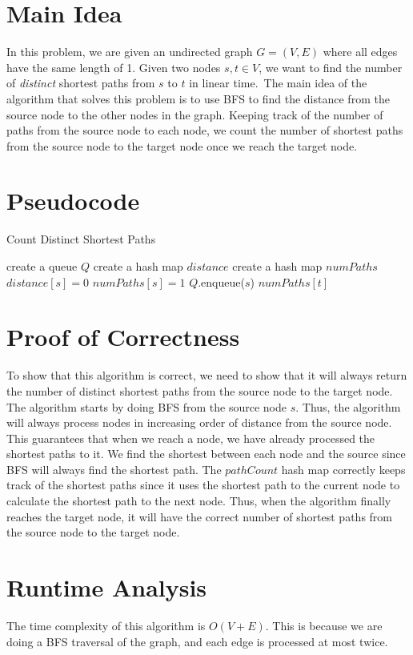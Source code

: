 \documentclass{article}
\begin{document}
\section{Main Idea}

In this problem, we are given an undirected graph $G = (V, E)$ where all edges have the same length of 1.
Given two nodes $s, t \in V$, we want to find the number of \textit{distinct} shortest paths from $s$ to $t$ in linear time.\
The main idea of the algorithm that solves this problem is to use BFS to find the distance from the source node to the other nodes in the graph.
Keeping track of the number of paths from the source node to each node, we count the number of shortest paths from the source node to the target node once we reach the target node.

\section{Pseudocode}

\begin{algorithm}[H]
\caption{Count Distinct Shortest Paths}
\KwOut{The number of distinct shortest paths from $s$ to $t$}
\BlankLine
create a queue $Q$\;
create a hash map $distance$\;
create a hash map $numPaths$\;
\BlankLine
{}
$distance[s] = 0$\;
$numPaths[s] = 1$\;
$Q$.enqueue($s$)\;
\BlankLine
{}
\Return $numPaths[t]$\;
\end{algorithm}

\section{Proof of Correctness}

To show that this algorithm is correct, we need to show that it will always return the number of distinct shortest paths from the source node to the target node.
The algorithm starts by doing BFS from the source node $s$.
Thus, the algorithm will always process nodes in increasing order of distance from the source node.
This guarantees that when we reach a node, we have already processed the shortest paths to it.
We find the shortest between each node and the source since BFS will always find the shortest path.
The $pathCount$ hash map correctly keeps track of the shortest paths since it uses the shortest path to the current node to calculate the shortest path to the next node.
Thus, when the algorithm finally reaches the target node, it will have the correct number of shortest paths from the source node to the target node.

\section{Runtime Analysis}

The time complexity of this algorithm is $O(V + E)$.
This is because we are doing a BFS traversal of the graph, and each edge is processed at most twice.
\end{document}
